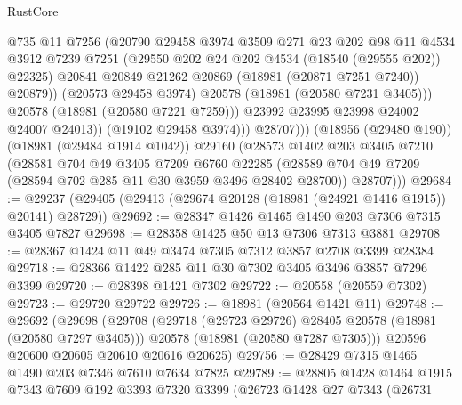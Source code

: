 \begin{lexlean}{RustCore}
\begin{coremodule}
                          @735
                          @11
                          @7256
                          (@20790
                            @29458
                            @3974
                            @3509
                            @271
                            @23
                            @202
                            @98
                            @11
                            @4534
                            @3912
                            @7239
                            @7251
                            (@29550 @202 @24 @202 @4534 (@18540 (@29555 @202)) @22325)
                            @20841
                            @20849
                            @21262
                            @20869
                            (@18981 (@20871 @7251 @7240))
                            @20879))
                        (@20573 @29458 @3974)
                        @20578
                        (@18981 (@20580 @7231 @3405)))
                      @20578
                      (@18981 (@20580 @7221 @7259)))
                    @23992
                    @23995
                    @23998
                    @24002
                    @24007
                    @24013))
                (@19102 @29458 @3974)))
            @28707)))
      (@18956 (@29480 @190))
      (@18981 (@29484 @1914 @1042))
      @29160
      (@28573
        @1402
        @203
        @3405
        @7210
        (@28581
          @704
          @49
          @3405
          @7209
          @6760
          @22285
          (@28589 @704 @49 @7209 (@28594 @702 @285 @11 @30 @3959 @3496 @28402 @28700))
          @28707)))
@29684 := @29237 (@29405 (@29413 (@29674 @20128 (@18981 (@24921 @1416 @1915)) @20141) @28729))
@29692 := @28347 @1426 @1465 @1490 @203 @7306 @7315 @3405 @7827
@29698 := @28358 @1425 @50 @13 @7306 @7313 @3881
@29708 := @28367 @1424 @11 @49 @3474 @7305 @7312 @3857 @2708 @3399 @28384
@29718 := @28366 @1422 @285 @11 @30 @7302 @3405 @3496 @3857 @7296 @3399
@29720 := @28398 @1421 @7302
@29722 := @20558 (@20559 @7302)
@29723 := @29720 @29722
@29726 := @18981 (@20564 @1421 @11)
@29748 := @29692
    (@29698
      (@29708
        (@29718 (@29723 @29726) @28405 @20578 (@18981 (@20580 @7297 @3405)))
        @20578
        (@18981 (@20580 @7287 @7305)))
      @20596
      @20600
      @20605
      @20610
      @20616
      @20625)
@29756 := @28429 @7315 @1465 @1490 @203 @7346 @7610 @7634 @7825
@29789 := @28805
    @1428
    @1464
    @1915
    @7343
    @7609
    @192
    @3393
    @7320
    @3399
    (@26723
      @1428
      @27
      @7343
      (@26731

\end{coremodule}
\end{lexlean}
